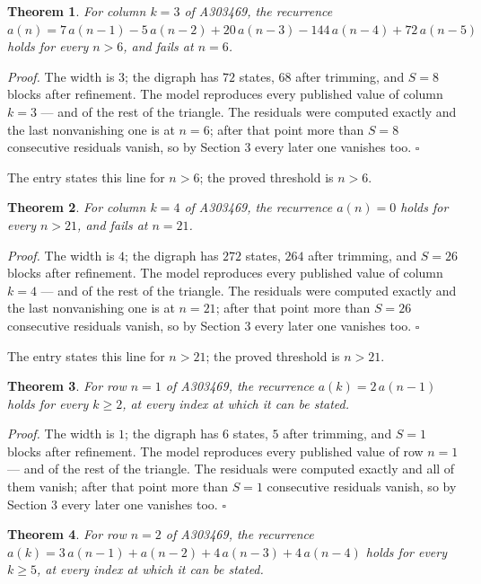 \documentclass[11pt]{article}
\newtheorem{theorem}{Theorem}
\theoremstyle{definition}
\begin{document}
\begin{theorem} For column $k = 3$ of A303469, the recurrence $a(n) = 7\,a(n-1) - 5\,a(n-2) + 20\,a(n-3) - 144\,a(n-4) + 72\,a(n-5)$ holds for every $n > 6$, and fails at $n = 6$.\end{theorem}

{\itshape Proof.} The width is $3$; the digraph has $72$ states, $68$ after trimming, and $S = 8$ blocks after refinement. The model reproduces every published value of column $k = 3$ --- and of the rest of the triangle. The residuals were computed exactly and the last nonvanishing one is at $n = 6$; after that point more than $S = 8$ consecutive residuals vanish, so by Section 3 every later one vanishes too. $\square$

The entry states this line for $n > 6$; the proved threshold is $n > 6$.

\begin{theorem} For column $k = 4$ of A303469, the recurrence $a(n) = 0$ holds for every $n > 21$, and fails at $n = 21$.\end{theorem}

{\itshape Proof.} The width is $4$; the digraph has $272$ states, $264$ after trimming, and $S = 26$ blocks after refinement. The model reproduces every published value of column $k = 4$ --- and of the rest of the triangle. The residuals were computed exactly and the last nonvanishing one is at $n = 21$; after that point more than $S = 26$ consecutive residuals vanish, so by Section 3 every later one vanishes too. $\square$

The entry states this line for $n > 21$; the proved threshold is $n > 21$.

\begin{theorem} For row $n = 1$ of A303469, the recurrence $a(k) = 2\,a(n-1)$ holds for every $k \ge 2$, at every index at which it can be stated.\end{theorem}

{\itshape Proof.} The width is $1$; the digraph has $6$ states, $5$ after trimming, and $S = 1$ blocks after refinement. The model reproduces every published value of row $n = 1$ --- and of the rest of the triangle. The residuals were computed exactly and all of them vanish; after that point more than $S = 1$ consecutive residuals vanish, so by Section 3 every later one vanishes too. $\square$

\begin{theorem} For row $n = 2$ of A303469, the recurrence $a(k) = 3\,a(n-1) + a(n-2) + 4\,a(n-3) + 4\,a(n-4)$ holds for every $k \ge 5$, at every index at which it can be stated.\end{theorem}
\end{document}
